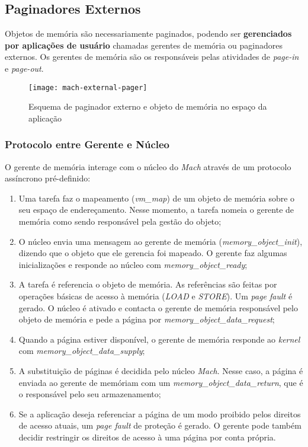 \subsection{Paginadores Externos}
Objetos de memória são necessariamente paginados, podendo ser \textbf{gerenciados por aplicações de usuário} chamadas gerentes de memória ou paginadores externos. Os gerentes de memória são os responsáveis pelas atividades de \textit{page-in} e \textit{page-out}.

\begin{figure}[H]
  \centering
  \texttt{[image: mach-external-pager]}
  \caption{Esquema de paginador externo e objeto de memória no espaço da aplicação}
  \label{fig:mach-external-pager}
\end{figure}

\subsubsection{Protocolo entre Gerente e Núcleo}
O gerente de memória interage com o núcleo do \textit{Mach} através de um protocolo assíncrono pré-definido:

\begin{enumerate}
  \item Uma tarefa faz o mapeamento (\textit{vm\_map}) de um objeto de memória sobre o seu espaço de endereçamento. Nesse momento, a tarefa nomeia o gerente de memória como sendo responsável pela gestão do objeto;

  \item O núcleo envia uma mensagem ao gerente de memória (\textit{memory\_object\_init}), dizendo que o objeto que ele gerencia foi mapeado. O gerente faz algumas inicializações e responde ao núcleo com \textit{memory\_object\_ready};

  \item A tarefa é referencia o objeto de memória. As referências são feitas por operações básicas de acesso à memória (\textit{LOAD} e \textit{STORE}). Um \textit{page fault} é gerado. O núcleo é ativado e contacta o gerente de memória responsável pelo objeto de memória e pede a página por \textit{memory\_object\_data\_request};

  \item Quando a página estiver disponível, o gerente de memória responde ao \textit{kernel} com \textit{memory\_object\_data\_supply};

  \item A substituição de páginas é decidida pelo núcleo \textit{Mach}. Nesse caso, a página é enviada ao gerente de memóriam com um \textit{memory\_object\_data\_return}, que é o responsável pelo seu armazenamento;

  \item Se a aplicação deseja referenciar a página de um modo proibido pelos direitos de acesso atuais, um \textit{page fault} de proteção é gerado. O gerente pode também decidir restringir os direitos de acesso à uma página por conta própria.
\end{enumerate}

